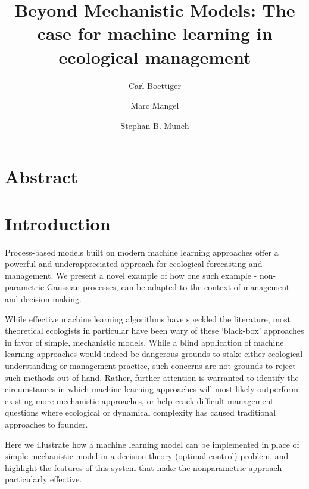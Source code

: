 \documentclass[author-year, review]{elsarticle} %
\begin{document}
\begin{frontmatter}
  \title{Beyond Mechanistic Models: The case for machine learning in ecological
         management}
  \author[cstar]{Carl Boettiger}
  \author[cstar]{Marc Mangel}
  \author[noaa]{Stephan B. Munch}
  \address[cstar]{Center for Stock Assessment Research, Department of Applied Math and Statistics, University of California, Mail Stop SOE-2, Santa Cruz, CA 95064, USA}
  \address[noaa]{Southwest Fisheries Science Center, National Oceanic and Atmospheric Administration, 110 Shaffer Road, Santa Cruz, CA 95060, USA}
 \end{frontmatter}


\section{Abstract}

\section{Introduction}

Process-based models built on modern machine learning approaches offer a
powerful and underappreciated approach for ecological forecasting and
management. We present a novel example of how one such example -
non-parametric Gaussian processes, can be adapted to the context of
management and decision-making.

While effective machine learning algorithms have speckled the
literature, most theoretical ecologists in particular have been wary of
these `black-box' approaches in favor of simple, mechanistic models.
While a blind application of machine learning approaches would indeed be
dangerous grounds to stake either ecological understanding or management
practice, such concerns are not grounds to reject such methods out of
hand. Rather, further attention is warranted to identify the
circumstances in which machine-learning approaches will most likely
outperform existing more mechanistic approaches, or help crack difficult
management questions where ecological or dynamical complexity has caused
traditional approaches to founder.

Here we illustrate how a machine learning model can be implemented in
place of simple mechanistic model in a decision theory (optimal control)
problem, and highlight the features of this system that make the
nonparametric approach particularly effective.
\end{document}
